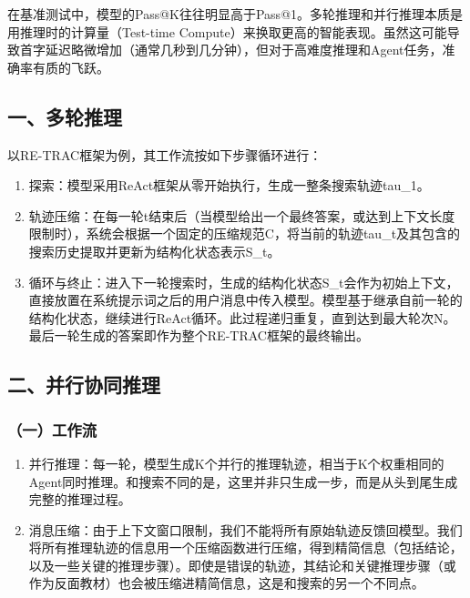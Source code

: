 在基准测试中，模型的Pass@K往往明显高于Pass@1。多轮推理和并行推理本质是用推理时的计算量（Test-time Compute）来换取更高的智能表现。虽然这可能导致首字延迟略微增加（通常几秒到几分钟），但对于高难度推理和Agent任务，准确率有质的飞跃。

\hypertarget{ux4e00ux591aux8f6eux63a8ux7406}{%
\subsection{一、多轮推理}\label{ux4e00ux591aux8f6eux63a8ux7406}}

以RE-TRAC框架为例，其工作流按如下步骤循环进行：

\begin{enumerate}
\def\labelenumi{\arabic{enumi}.}
\item
  探索：模型采用ReAct框架从零开始执行，生成一整条搜索轨迹tau\_1。
\item
  轨迹压缩：在每一轮t结束后（当模型给出一个最终答案，或达到上下文长度限制时），系统会根据一个固定的压缩规范C，将当前的轨迹tau\_t及其包含的搜索历史提取并更新为结构化状态表示S\_t。
\item
  循环与终止：进入下一轮搜索时，生成的结构化状态S\_t会作为初始上下文，直接放置在系统提示词之后的用户消息中传入模型。模型基于继承自前一轮的结构化状态，继续进行ReAct循环。此过程递归重复，直到达到最大轮次N。最后一轮生成的答案即作为整个RE-TRAC框架的最终输出。
\end{enumerate}

\hypertarget{ux4e8cux5e76ux884cux534fux540cux63a8ux7406}{%
\subsection{二、并行协同推理}\label{ux4e8cux5e76ux884cux534fux540cux63a8ux7406}}

\hypertarget{ux4e00ux5de5ux4f5cux6d41}{%
\subsubsection{（一）工作流}\label{ux4e00ux5de5ux4f5cux6d41}}

\begin{enumerate}
\def\labelenumi{\arabic{enumi}.}
\item
  并行推理：每一轮，模型生成K个并行的推理轨迹，相当于K个权重相同的Agent同时推理。和搜索不同的是，这里并非只生成一步，而是从头到尾生成完整的推理过程。
\item
  消息压缩：由于上下文窗口限制，我们不能将所有原始轨迹反馈回模型。我们将所有推理轨迹的信息用一个压缩函数进行压缩，得到精简信息（包括结论，以及一些关键的推理步骤）。即使是错误的轨迹，其结论和关键推理步骤（或作为反面教材）也会被压缩进精简信息，这是和搜索的另一个不同点。
\end{enumerate}

